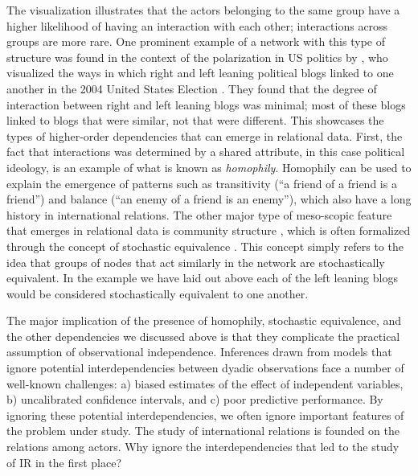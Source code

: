 The visualization illustrates that the actors belonging to the same group have a higher likelihood of having an interaction with each other; interactions across groups are more rare. One prominent example of a network with this type of structure was found in the context of the polarization in US politics by \citet{adamic:glance:2005}, who visualized the ways in which right and left leaning political blogs linked to one another in the 2004 United States Election \citep{adamic:glance:2005}. They found that the degree of interaction between right and left leaning blogs was minimal; most of these blogs linked to blogs that were similar, not that were different. This showcases the types of higher-order dependencies that can emerge in relational data. First, the fact that interactions was determined by a shared attribute, in this case political ideology, is an example of what is known as \textit{homophily}. Homophily can be used to explain the emergence of patterns such as transitivity (``a friend of a friend is a friend'') and balance (``an enemy of a friend is an enemy''), which also have a long history in international relations. The other major type of meso-scopic feature that emerges in relational data is community structure \citep{mucha:etal:2010}, which is often formalized through the concept of stochastic equivalence \citep{anderson:etal:1992}. This concept simply refers to the idea that groups of nodes that act similarly in the network are stochastically equivalent. In the example we have laid out above each of the left leaning blogs would be considered stochastically equivalent to one another. 

The major implication of the presence of homophily, stochastic equivalence, and the other dependencies we discussed above is that they complicate the practical assumption of observational independence. Inferences drawn from models that ignore potential interdependencies between dyadic observations face a number of well-known challenges: a) biased estimates of the effect of independent variables, b) uncalibrated confidence intervals, and c) poor predictive performance. By ignoring these potential interdependencies, we often ignore important features of the problem under study. The study of international relations is founded on the relations among actors. Why ignore the interdependencies that led to the study of IR in the first place?


